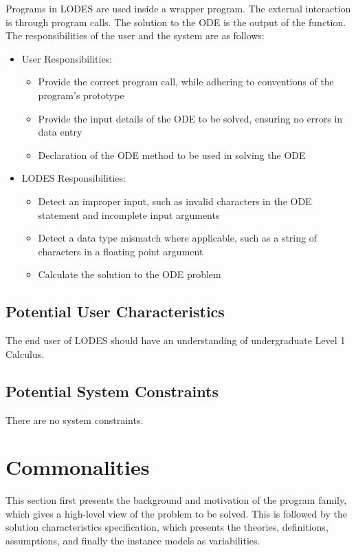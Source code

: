 \documentclass[12pt]{article}
\newcommand{\progname}{LODES} %
\begin{document}
Programs in \progname{} are used inside a wrapper program.  The external interaction is through
program calls. The solution to the ODE is the output of the function.  The responsibilities of
the user and the system are as follows:

\begin{itemize}
\item User Responsibilities:
\begin{itemize}
\item Provide the correct program call, while adhering to conventions of the program's prototype
\item Provide the input details of the ODE to be solved, ensuring no errors in data entry
\item Declaration of the ODE method to be used in solving the ODE
\end{itemize}
\item \progname{} Responsibilities:
\begin{itemize}
\item Detect an improper input, such as invalid characters in the ODE statement and incomplete input arguments
\item Detect a data type mismatch where applicable, such as a string of characters in a floating point argument
\item Calculate the solution to the ODE problem
\end{itemize}
\end{itemize}

\subsection{Potential User Characteristics} \label{SecUserCharacteristics}

The end user of \progname{} should have an understanding of undergraduate Level
1 Calculus.

\subsection{Potential System Constraints}

There are no system constraints.

\section{Commonalities}

This section first presents the background and motivation of the program family, which gives a high-level
view of the problem to be solved.  This is followed by the solution characteristics
specification, which presents the theories, definitions, assumptions, and finally
the instance models as variabilities.
\end{document}
